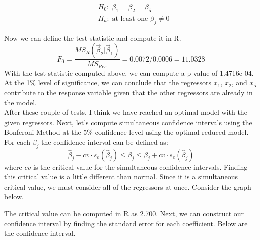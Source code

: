 \documentclass[12pt,letterpaper]{article}
\begin{document}
\begin{align*}
	&H_0:\;\beta_1=\beta_2=\beta_5\\
	&H_a:\;\text{at least one $\beta_j\neq 0$}
\end{align*}

Now we can define the test statistic and compute it in R. $$F_0=\frac{MS_R\left(\vec{\beta}_2|\vec{\beta}_1\right)}{MS_{Res}}=0.0072/0.0006=11.0328$$ With the test statistic computed above, we can compute a p-value of 1.4716e-04. At the 1\% level of significance, we can conclude that the regressors $x_1$, $x_2$, and $x_5$ contribute to the response variable given that the other regressors are already in the model.\\[3mm]
After these couple of tests, I think we have reached an optimal model with the given regressors. Next, let's compute simultaneous confidence intervals using the Bonferoni Method at the 5\% confidence level using the optimal reduced model. For each $\beta_j$ the confidence interval can be defined as: $$\hat{\beta}_j-cv\cdot s_e\left(\hat{\beta}_j\right)\leq \beta_j\leq\hat{\beta}_j+cv\cdot s_e\left(\hat{\beta}_j\right)$$ where $cv$ is the critical value for the simultaneous confidence intervals. Finding this critical value is a little different than normal. Since it is a simultaneous critical value, we must consider all of the regressors at once. Consider the graph below.

\begin{center}
	\end{center}
	
The critical value can be computed in R as 2.700. Next, we can construct our confidence interval by finding the standard error for each coefficient. Below are the confidence interval.
\end{document}
